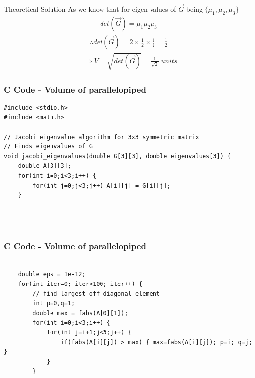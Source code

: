 \documentclass{beamer}
\begin{document}
\begin{frame}{Theoretical Solution}
As we know that for eigen values of $\vec{G}$ being $\{\mu_1,\mu_2,\mu_3\}$
\begin{align*}
    det(\vec{G})=\mu_1\mu_2\mu_3
\end{align*}
\begin{align*}
    \therefore det(\vec{G})=2\times\frac{1}{2}\times\frac{1}{2}=\frac{1}{2}
\end{align*}
\begin{align*}
    \implies V=\sqrt{det(\vec{G})}=\frac{1}{\sqrt{2}} \; units
\end{align*}
\end{frame}

\begin{frame}[fragile]
    \frametitle{C Code - Volume of parallelopiped}

    \begin{lstlisting}
#include <stdio.h>
#include <math.h>

// Jacobi eigenvalue algorithm for 3x3 symmetric matrix
// Finds eigenvalues of G
void jacobi_eigenvalues(double G[3][3], double eigenvalues[3]) {
    double A[3][3];
    for(int i=0;i<3;i++) {
        for(int j=0;j<3;j++) A[i][j] = G[i][j];
    }


        
    \end{lstlisting}
\end{frame}

\begin{frame}[fragile]
    \frametitle{C Code - Volume of parallelopiped}

    \begin{lstlisting}

    double eps = 1e-12;
    for(int iter=0; iter<100; iter++) {
        // find largest off-diagonal element
        int p=0,q=1;
        double max = fabs(A[0][1]);
        for(int i=0;i<3;i++) {
            for(int j=i+1;j<3;j++) {
                if(fabs(A[i][j]) > max) { max=fabs(A[i][j]); p=i; q=j; }
            }
        }
        
    \end{lstlisting}
\end{frame}
\end{document}
